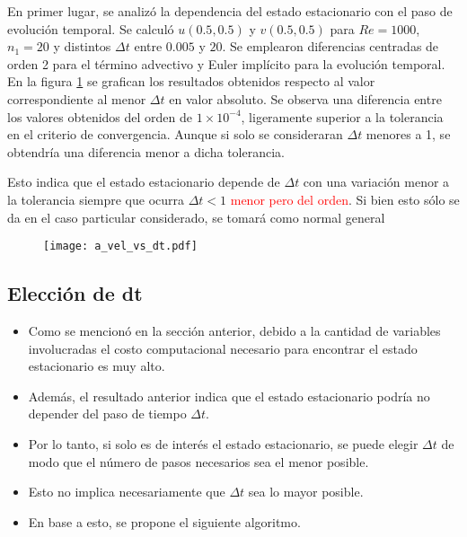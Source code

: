 \documentclass[aps,prb,twocolumn,superscriptaddress,floatfix,longbibliography,10pt]{revtex4-2}
\newcounter{para}
\begin{document}
En primer lugar, se analizó la dependencia del estado estacionario con el paso de evolución temporal. Se calculó $u(0.5,0.5)$ y $v(0.5,0.5)$ para $Re = 1000$, $n_1 = 20$ y distintos $\Delta t$ entre $0.005$ y $20$. Se emplearon diferencias centradas de orden 2 para el término advectivo y Euler implícito para la evolución temporal. En la figura \ref{fig:a_vel_vs_dt} se grafican los resultados obtenidos respecto al valor correspondiente al menor $\Delta t$ en valor absoluto. Se observa una diferencia entre los valores obtenidos del orden de $1 \times 10^{-4}$, ligeramente superior a la tolerancia en el criterio de convergencia. Aunque si solo se consideraran $\Delta t$ menores a 1, se obtendría una diferencia menor a dicha tolerancia.

Esto indica que el estado estacionario depende de $\Delta t$ con una variación menor a la tolerancia siempre que ocurra $\Delta t < 1$ \textcolor{red}{menor pero del orden}. Si bien esto sólo se da en el caso particular considerado, se tomará como normal general



\begin{figure}[h]
  \texttt{[image: a\_vel\_vs\_dt.pdf]}
  \caption{}
   \label{fig:a_vel_vs_dt}
\end{figure}



\subsection{Elección de dt}

\begin{itemize}
  \item Como se mencionó en la sección anterior, debido a la cantidad de variables involucradas el costo computacional necesario para encontrar el estado estacionario es muy alto.
  \item Además, el resultado anterior indica que el estado estacionario podría no depender del paso de tiempo $\Delta t$.
  \item Por lo tanto, si solo es de interés el estado estacionario, se puede elegir $\Delta t$ de modo que el número de pasos necesarios sea el menor posible.
  \item Esto no implica necesariamente que $\Delta t$ sea lo mayor posible.
  \item En base a esto, se propone el siguiente algoritmo.
\end{itemize}
\end{document}
